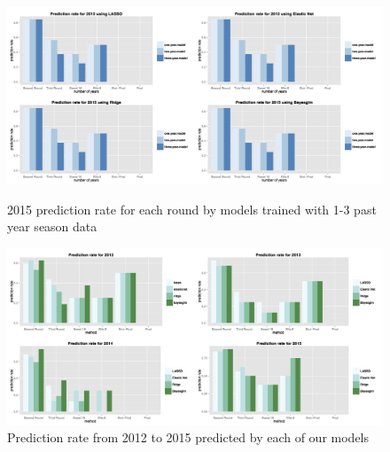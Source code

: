 \documentclass{article} %
\begin{document}
\begin{figure}[H]
\begin{center}
   \includegraphics[scale = 0.17]{year.jpg}
\end{center}
\caption{2015 prediction rate for each round by models trained with 1-3 past year season data}

\begin{center}
   \includegraphics[scale = 0.17]{model.jpg}
\end{center}
\caption{Prediction rate from 2012 to 2015 predicted by each of our models}
\end{figure}
\end{document}
